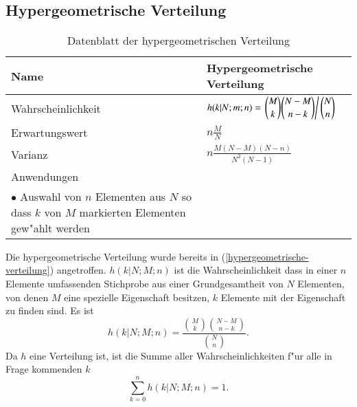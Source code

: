 %
%
%
\subsection{Hypergeometrische Verteilung\label{section-hypergeometrischeverteilung}}
\begin{table}
\renewcommand{\arraystretch}{1.5}
\begin{center}
\begin{tabular}{|l|l|}
\hline
Name&Hypergeometrische Verteilung\\
\hline
Wahrscheinlichkeit&
\begin{minipage}{3.7in}
\vskip3pt
$\displaystyle
h(k|N;m;n)=
\left.\binom{M}{k}\binom{N-M}{n-k}\right/\binom{N}{n}
$
\end{minipage}
\\[10pt]
Erwartungswert&$\displaystyle n\frac{M}{N}$\\[10pt]
Varianz&$\displaystyle
n\frac{M(N-M)(N-n)}{N^2(N-1)}
$\\[10pt]
\hline
Anwendungen&\begin{minipage}{3.7in}%
\vskip3pt
\strut
$\bullet$ Lotto\\
$\bullet$ Auswahl von $n$ Elementen aus $N$ so dass $k$ von $M$ markierten
Elementen gew"ahlt werden
\strut
\end{minipage}\\[18pt]
\hline
\end{tabular}
\end{center}
\caption{Datenblatt der hypergeometrischen Verteilung\label{datenblatt:hypergeometrischeverteilung}}
\end{table}

Die hypergeometrische Verteilung wurde bereits in
(\ref{hypergeometrische-verteilung}) angetroffen.
$h(k|N;M;n)$ ist die
Wahrscheinlichkeit dass in einer $n$ Elemente umfassenden Stichprobe aus
einer Grundgesamtheit von $N$ Elementen, von denen $M$ eine spezielle
Eigenschaft besitzen, $k$ Elemente mit der Eigenschaft zu finden sind.
Es ist
\[
h(k|N;M;n)=\frac{\binom{M}{k}\binom{N-M}{n-k}}{\binom{N}{n}}.
\]
Da $h$ eine Verteilung ist, ist die Summe aller Wahrscheinlichkeiten
f"ur alle in Frage kommenden $k$
\[
\sum_{k=0}^nh(k|N;M;n)=1.
\]
